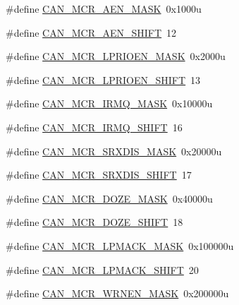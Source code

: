 \begin{DoxyCompactItemize}
\item 
\#define \hyperlink{group___c_a_n___register___masks_gaf788111bd2bf9a69160d0a0cb713c926}{C\+A\+N\+\_\+\+M\+C\+R\+\_\+\+A\+E\+N\+\_\+\+M\+A\+SK}~0x1000u
\item 
\#define \hyperlink{group___c_a_n___register___masks_ga6c610bd65cb9471ad0ca511dbe2c86d4}{C\+A\+N\+\_\+\+M\+C\+R\+\_\+\+A\+E\+N\+\_\+\+S\+H\+I\+FT}~12
\item 
\#define \hyperlink{group___c_a_n___register___masks_ga1420cc0cb40d414296a741397ee07116}{C\+A\+N\+\_\+\+M\+C\+R\+\_\+\+L\+P\+R\+I\+O\+E\+N\+\_\+\+M\+A\+SK}~0x2000u
\item 
\#define \hyperlink{group___c_a_n___register___masks_gaaf89fabb5183062196edf8dc4a3f6770}{C\+A\+N\+\_\+\+M\+C\+R\+\_\+\+L\+P\+R\+I\+O\+E\+N\+\_\+\+S\+H\+I\+FT}~13
\item 
\#define \hyperlink{group___c_a_n___register___masks_gad68843c21c6243f255601d8973f4e7eb}{C\+A\+N\+\_\+\+M\+C\+R\+\_\+\+I\+R\+M\+Q\+\_\+\+M\+A\+SK}~0x10000u
\item 
\#define \hyperlink{group___c_a_n___register___masks_gae30b928fb3ce512c48cb0be04af69acd}{C\+A\+N\+\_\+\+M\+C\+R\+\_\+\+I\+R\+M\+Q\+\_\+\+S\+H\+I\+FT}~16
\item 
\#define \hyperlink{group___c_a_n___register___masks_ga29b3d428d19a7204c53f56c7467172f1}{C\+A\+N\+\_\+\+M\+C\+R\+\_\+\+S\+R\+X\+D\+I\+S\+\_\+\+M\+A\+SK}~0x20000u
\item 
\#define \hyperlink{group___c_a_n___register___masks_gae2513ad87a72bc6f2bb88be59a3e0836}{C\+A\+N\+\_\+\+M\+C\+R\+\_\+\+S\+R\+X\+D\+I\+S\+\_\+\+S\+H\+I\+FT}~17
\item 
\#define \hyperlink{group___c_a_n___register___masks_ga55186858d9af22af7cc553e03a39a952}{C\+A\+N\+\_\+\+M\+C\+R\+\_\+\+D\+O\+Z\+E\+\_\+\+M\+A\+SK}~0x40000u
\item 
\#define \hyperlink{group___c_a_n___register___masks_ga9ea9e456a704e4252eddcbd4e68a27ad}{C\+A\+N\+\_\+\+M\+C\+R\+\_\+\+D\+O\+Z\+E\+\_\+\+S\+H\+I\+FT}~18
\item 
\#define \hyperlink{group___c_a_n___register___masks_ga599f0c162d665f019269aace68e3fb17}{C\+A\+N\+\_\+\+M\+C\+R\+\_\+\+L\+P\+M\+A\+C\+K\+\_\+\+M\+A\+SK}~0x100000u
\item 
\#define \hyperlink{group___c_a_n___register___masks_ga3bd209cf2829ba4c96fc00ec18c6e2d6}{C\+A\+N\+\_\+\+M\+C\+R\+\_\+\+L\+P\+M\+A\+C\+K\+\_\+\+S\+H\+I\+FT}~20
\item 
\#define \hyperlink{group___c_a_n___register___masks_ga235a7c2b04cfd0765fa2a9313fc1fcd1}{C\+A\+N\+\_\+\+M\+C\+R\+\_\+\+W\+R\+N\+E\+N\+\_\+\+M\+A\+SK}~0x200000u

\end{DoxyCompactItemize}
